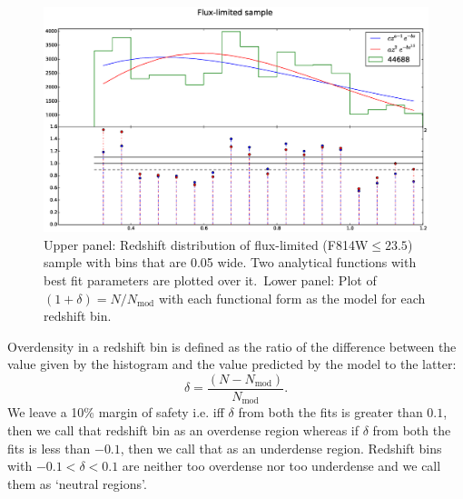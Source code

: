 \documentclass[twocolumn,useAMS,usenatbib]{mn2e}
\newcommand{\rachel}[1]{{\textcolor{red}{#1}}}
\begin{document}
\begin{figure}
 \centering
  \includegraphics[width=\columnwidth]{redshift_fluxlimited}
  \caption{Upper panel: Redshift distribution of flux-limited (F814W$\le 23.5$) sample with bins that are 0.05 wide. Two analytical functions with best fit parameters are plotted over it.\
           Lower panel: Plot of $(1+\delta) = N/N_{\text{mod}}$ with each functional form as the model for each redshift bin.}
  \label{fig:redshift_fluxlimited}
\end{figure}

Overdensity in a redshift bin is defined as the ratio of the
difference between the value given by the histogram and the value
predicted by the model to the latter:
\begin{equation}
\delta=\frac{(N-N_{\text{mod}})}{N_{\text{mod}}}.  
\end{equation}
We leave a 10\% margin of safety i.e. iff $\delta$ from both the fits is greater than $0.1$, then we call that redshift bin as an
overdense region whereas if $\delta$ from both the fits is less than $-0.1$, then we call that as an underdense region. Redshift bins with $-0.1 < \delta < 0.1$ are neither too overdense
nor too underdense and we call them as `neutral regions'.

\end{document}
